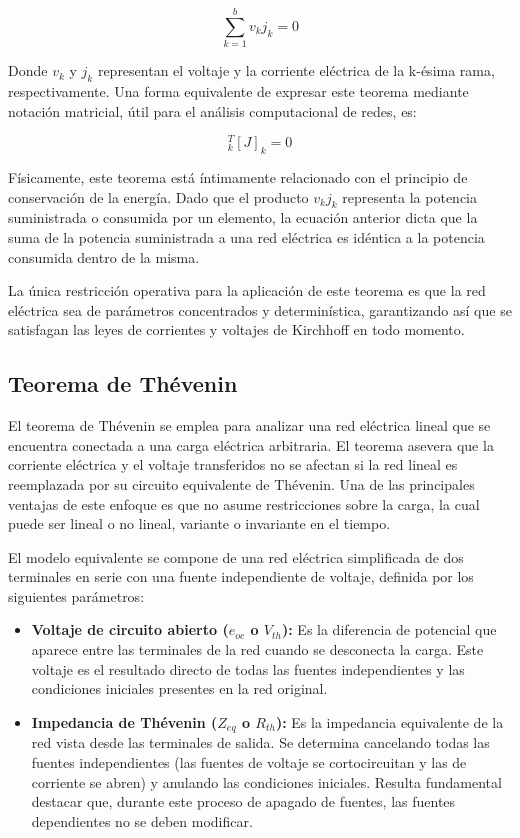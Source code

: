 \begin{equation}
	\sum_{k=1}^{b} v_{k} j_{k} = 0
\end{equation}

Donde $v_{k}$ y $j_{k}$ representan el voltaje y la corriente eléctrica de la k-ésima rama, respectivamente. Una forma equivalente de expresar este teorema mediante notación matricial, útil para el análisis computacional de redes, es:

\begin{equation}
	[V]_{k}^{T} [J]_{k} = 0
\end{equation}

Físicamente, este teorema está íntimamente relacionado con el principio de conservación de la energía. Dado que el producto $v_{k} j_{k}$ representa la potencia suministrada o consumida por un elemento, la ecuación anterior dicta que la suma de la potencia suministrada a una red eléctrica es idéntica a la potencia consumida dentro de la misma. 

La única restricción operativa para la aplicación de este teorema es que la red eléctrica sea de parámetros concentrados y determinística, garantizando así que se satisfagan las leyes de corrientes y voltajes de Kirchhoff en todo momento.

\subsection{Teorema de Thévenin}
El teorema de Thévenin se emplea para analizar una red eléctrica lineal que se encuentra conectada a una carga eléctrica arbitraria. El teorema asevera que la corriente eléctrica y el voltaje transferidos no se afectan si la red lineal es reemplazada por su circuito equivalente de Thévenin. Una de las principales ventajas de este enfoque es que no asume restricciones sobre la carga, la cual puede ser lineal o no lineal, variante o invariante en el tiempo.

El modelo equivalente se compone de una red eléctrica simplificada de dos terminales en serie con una fuente independiente de voltaje, definida por los siguientes parámetros:
\begin{itemize}
	\item \textbf{Voltaje de circuito abierto ($e_{oc}$ o $V_{th}$):} Es la diferencia de potencial que aparece entre las terminales de la red cuando se desconecta la carga. Este voltaje es el resultado directo de todas las fuentes independientes y las condiciones iniciales presentes en la red original.
	\item \textbf{Impedancia de Thévenin ($Z_{eq}$ o $R_{th}$):} Es la impedancia equivalente de la red vista desde las terminales de salida. Se determina cancelando todas las fuentes independientes (las fuentes de voltaje se cortocircuitan y las de corriente se abren) y anulando las condiciones iniciales. Resulta fundamental destacar que, durante este proceso de apagado de fuentes, las fuentes dependientes no se deben modificar.
\end{itemize}

